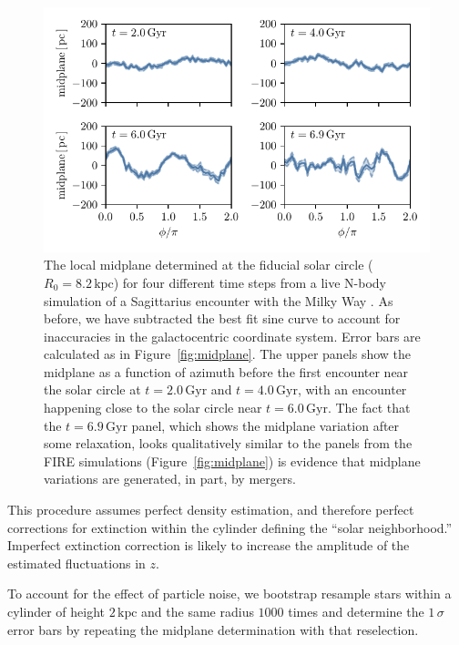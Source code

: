 \documentclass[twocolumn]{aastex62}
\newcommand{\kpc}{\text{kpc}}
\newcommand{\Gyr}{\text{Gyr}}
\begin{document}
\begin{figure}[htb!]
\begin{center}
\includegraphics[width=342.078286667pt]{fig/midplane_fit_chervinsim.pdf}
\end{center}
\caption{The local midplane determined at the fiducial solar circle
($R_0 = 8.2\,\kpc$) for four different time steps from a live N-body
simulation of a Sagittarius encounter with the Milky Way
\citep{2018MNRAS.481..286L}. As before, we have subtracted the best fit sine
curve to account for inaccuracies in the galactocentric coordinate system.
Error bars are calculated as in Figure~\ref{fig:midplane}. The upper panels
show the midplane as a function of azimuth before the first encounter near the
solar circle at $t=2.0\,\Gyr$ and $t=4.0\,\Gyr$, with an encounter happening
close to the solar circle near $t=6.0\,\Gyr$. The fact that the $t=6.9\,\Gyr$
panel, which shows the midplane variation after some relaxation, looks
qualitatively similar to the panels from the FIRE simulations
(Figure~\ref{fig:midplane}) is evidence that midplane variations are
generated, in part, by mergers.}
\label{fig:midplane_chervin}
\end{figure}

This procedure assumes perfect density estimation, and therefore perfect
corrections for extinction within the cylinder defining the ``solar
neighborhood.'' Imperfect extinction correction is likely to increase the
amplitude of the estimated fluctuations in $z$.

To account for the effect of particle noise, we bootstrap resample stars
within a cylinder of height $2\,\kpc$ and the same radius $1000$ times and
determine the $1\,\sigma$ error bars by repeating the midplane determination
with that reselection.
\end{document}
